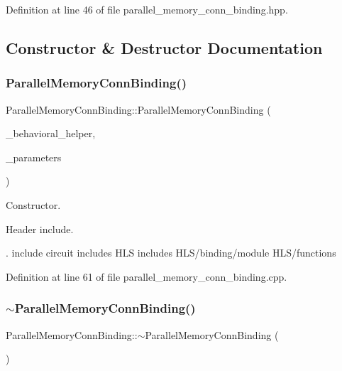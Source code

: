 Definition at line 46 of file parallel\+\_\+memory\+\_\+conn\+\_\+binding.\+hpp.



\subsection{Constructor \& Destructor Documentation}
\mbox{\label{classParallelMemoryConnBinding_a51b30466ed129d8391c0af95e7ea02cb}} 
\subsubsection{\texorpdfstring{Parallel\+Memory\+Conn\+Binding()}{ParallelMemoryConnBinding()}}
{\footnotesize\ttfamily Parallel\+Memory\+Conn\+Binding\+::\+Parallel\+Memory\+Conn\+Binding (\begin{DoxyParamCaption}\item[{const \hyperlink{behavioral__helper_8hpp_aae973b54cac87eef3b27442aa3e1e425}{Behavioral\+Helper\+Const\+Ref}}]{\+\_\+behavioral\+\_\+helper,  }\item[{const \hyperlink{Parameter_8hpp_a37841774a6fcb479b597fdf8955eb4ea}{Parameter\+Const\+Ref}}]{\+\_\+parameters }\end{DoxyParamCaption})}



Constructor. 

Header include.

. include circuit includes H\+LS includes H\+L\+S/binding/module H\+L\+S/functions 

Definition at line 61 of file parallel\+\_\+memory\+\_\+conn\+\_\+binding.\+cpp.

\mbox{\label{classParallelMemoryConnBinding_a739b6a78e3485ac3cf3d6ad88093b07e}} 
\subsubsection{\texorpdfstring{$\sim$\+Parallel\+Memory\+Conn\+Binding()}{~ParallelMemoryConnBinding()}}
{\footnotesize\ttfamily Parallel\+Memory\+Conn\+Binding\+::$\sim$\+Parallel\+Memory\+Conn\+Binding (\begin{DoxyParamCaption}{ }\end{DoxyParamCaption})\hspace{0.3cm}{\ttfamily [virtual]}}



